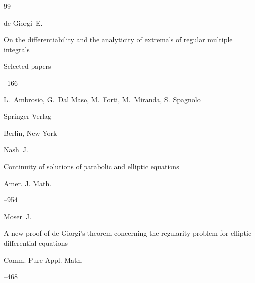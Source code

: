 \begin{thebibliography}{99}

\transl

\by de Giorgi~E.

\paper On the differentiability and the analyticity of extremals of regular multiple integrals

\inbook Selected papers


--166

\eds L.~Ambrosio, G.~Dal Maso, M.~Forti, M.~Miranda, S.~Spagnolo

\publ Springer-Verlag

\publaddr Berlin, New York






\by Nash~J.

\paper Continuity of solutions of parabolic and elliptic equations

\jour Amer. J. Math.




--954







\by Moser~J.

\paper A new proof of de Giorgi's theorem concerning the regularity problem for elliptic differential equations

\jour Comm. Pure Appl. Math.




--468







\end{thebibliography}
